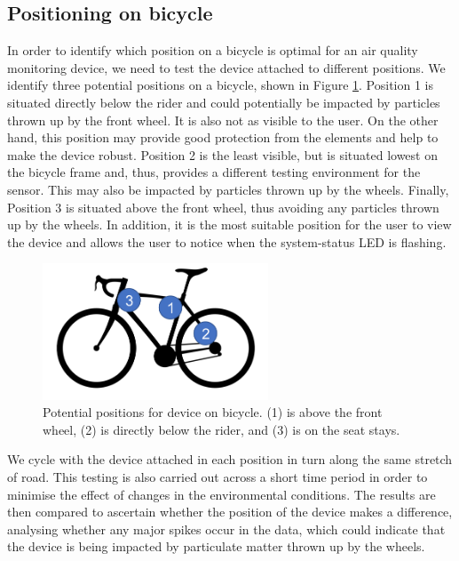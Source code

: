 \documentclass[11pt,twosided,a4paper]{report}
\begin{document}
\subsection{Positioning on bicycle} \label{position_testing}

In order to identify which position on a bicycle is optimal for an air quality monitoring device, we need to test the device attached to different positions. We identify three potential positions on a bicycle, shown in Figure \ref{bicycle_positions}. Position 1 is situated directly below the rider and could potentially be impacted by particles thrown up by the front wheel. It is also not as visible to the user. On the other hand, this position may provide good protection from the elements and help to make the device robust. Position 2 is the least visible, but is situated lowest on the bicycle frame and, thus, provides a different testing environment for the sensor. This may also be impacted by particles thrown up by the wheels. Finally, Position 3 is situated above the front wheel, thus avoiding any particles thrown up by the wheels. In addition, it is the most suitable position for the user to view the device and allows the user to notice when the system-status LED is flashing. 

\begin{figure}[!tb]
\centering
\includegraphics[width=0.6\textwidth]{images/bicycle_positions}
\caption[Device positions on bicycle.]{Potential positions for device on bicycle. (1) is above the front wheel, (2) is directly below the rider, and (3) is on the seat stays.}
\label{bicycle_positions}
\end{figure}

We cycle with the device attached in each position in turn along the same stretch of road. This testing is also carried out across a short time period in order to minimise the effect of changes in the environmental conditions. The results are then compared to ascertain whether the position of the device makes a difference, analysing whether any major spikes occur in the data, which could indicate that the device is being impacted by particulate matter thrown up by the wheels.
\end{document}
